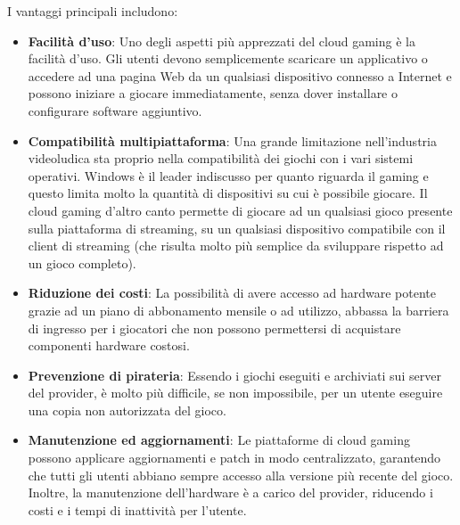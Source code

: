 \documentclass[12pt,a4paper,openright,twoside]{book}
\begin{document}
I vantaggi principali includono:
\begin{itemize}
    \item \textbf{Facilità d'uso}: Uno degli aspetti più apprezzati del cloud gaming è la facilità d'uso. Gli utenti devono semplicemente scaricare un applicativo o accedere ad una pagina Web da un qualsiasi dispositivo connesso a Internet e possono iniziare a giocare immediatamente, senza dover installare o configurare software aggiuntivo. 
    \item \textbf{Compatibilità multipiattaforma}: Una grande limitazione nell'industria videoludica sta proprio nella compatibilità dei giochi con i vari sistemi operativi. Windows è il leader indiscusso per quanto riguarda il gaming e questo limita molto la quantità di dispositivi su cui è possibile giocare. Il cloud gaming d'altro canto permette di giocare ad un qualsiasi gioco presente sulla piattaforma di streaming, su un qualsiasi dispositivo compatibile con il client di streaming (che risulta molto più semplice da sviluppare rispetto ad un gioco completo).
    \item \textbf{Riduzione dei costi}: La possibilità di avere accesso ad hardware potente grazie ad un piano di abbonamento mensile o ad utilizzo, abbassa la barriera di ingresso per i giocatori che non possono permettersi di acquistare componenti hardware costosi.
    \item \textbf{Prevenzione di pirateria}: Essendo i giochi eseguiti e archiviati sui server del provider, è molto più difficile, se non impossibile, per un utente eseguire una copia non autorizzata del gioco.
    \item \textbf{Manutenzione ed aggiornamenti}: Le piattaforme di cloud gaming possono applicare aggiornamenti e patch in modo centralizzato, garantendo che tutti gli utenti abbiano sempre accesso alla versione più recente del gioco. Inoltre, la manutenzione dell'hardware è a carico del provider, riducendo i costi e i tempi di inattività per l'utente.
\end{itemize}
\end{document}
